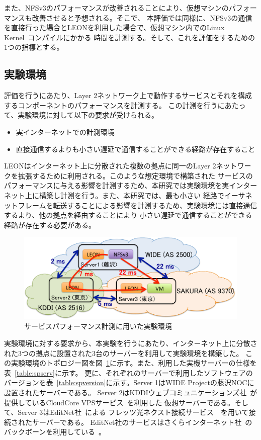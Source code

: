 また、NFSv3のパフォーマンスが改善されることにより、仮想マシンのパフォーマンスも改善させると予想される。そこで、
本評価では同様に、NFSv3の通信を直接行った場合とLEONを利用した場合で、仮想マシン内でのLinux Kernel~\cite{linuxkernel}コンパイルにかかる
時間を計測する。そして、これを評価をするための1つの指標とする。

\subsection{実験環境}
\label{spexpenv}

評価を行うにあたり、Layer 2ネットワーク上で動作するサービスとそれを構成するコンポーネントのパフォーマンスを計測する。
この計測を行うにあたって、実験環境に対して以下の要求が受けられる。

\begin{itemize}
	\item{実インターネットでの計測環境}
	\item{直接通信するよりも小さい遅延で通信することができる経路が存在すること}
\end{itemize}

LEONはインターネット上に分散された複数の拠点に同一のLayer 2ネットワークを拡張するために利用される。このような想定環境で構築された
サービスのパフォーマンスに与える影響を計測するため、本研究では実験環境を実インターネット上に構築し計測を行う。また、本研究では、最も小さい
経路でイーサネットフレームを転送することによる影響を計測するため、実験環境には直接通信するより、他の拠点を経由することにより
小さい遅延で通信することができる経路が存在する必要がある。

\begin{figure}
	\begin{center}
		\includegraphics[scale=0.65]{./img/spexp}
		\caption{サービスパフォーマンス計測に用いた実験環境}
		\label{img:spexp}
	\end{center}
\end{figure}

実験環境に対する要求から、本実験を行うにあたり、インターネット上に分散された3つの拠点に設置された3台のサーバーを利用して実験環境を構築した。
この実験環境のトポロジー図を図~\ref{img:spexp}に示す。また、利用した実機サーバーの仕様を表~\ref{table:spserv}に示す。
更に、それぞれのサーバーで利用したソフトウェアのバージョンを表~\ref{table:spversion}に示す。Server 1はWIDE Projectの藤沢NOCに設置されたサーバーである。
Server 2はKDDIウェブコミュニケーションズ社~\cite{kddiwebcom}が提供しているCloudCore VPSサービス~\cite{cloudcore}を利用した
仮想サーバーである。そして、Server 3はEditNet社~\cite{editnet}による
フレッツ光ネクスト接続サービス~\cite{enflets}~\cite{nttflets}を用いて接続されたサーバーである。
EditNet社のサービスはさくらインターネット社~\cite{sakurainc}のバックボーンを利用している~\cite{enbb}。

